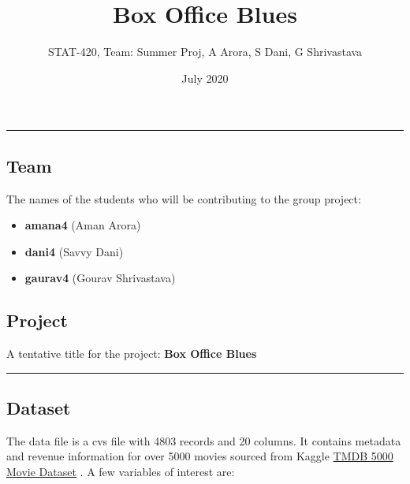 \documentclass[
]{article}
\title{Box Office Blues}
\author{STAT-420, Team: Summer Proj, A Arora, S Dani, G Shrivastava}
\date{July 2020}
\providecommand{\tightlist}{%
  \setlength{\itemsep}{0pt}\setlength{\parskip}{0pt}}
\begin{document}
\maketitle

\begin{center}\rule{0.5\linewidth}{0.5pt}\end{center}

\hypertarget{team}{%
\subsection{Team}\label{team}}

The names of the students who will be contributing to the group project:

\begin{itemize}
\tightlist
\item
  \textbf{amana4} (Aman Arora)
\item
  \textbf{dani4} (Savvy Dani)
\item
  \textbf{gaurav4} (Gourav Shrivastava)
\end{itemize}

\hypertarget{project}{%
\subsection{Project}\label{project}}

A tentative title for the project: \textbf{Box Office Blues}

\begin{center}\rule{0.5\linewidth}{0.5pt}\end{center}

\hypertarget{dataset}{%
\subsection{Dataset}\label{dataset}}

The data file is a cvs file with 4803 records and 20 columns. It
contains metadata and revenue information for over 5000 movies sourced
from Kaggle
\href{https://www.kaggle.com/tmdb/tmdb-movie-metadata?select=tmdb_5000_movies.csv}{TMDB
5000 Movie Dataset} . A few variables of interest are:
\end{document}
